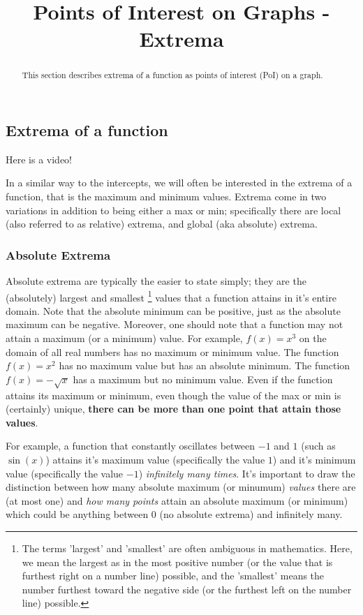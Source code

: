 \documentclass{ximera}
\title{Points of Interest on Graphs - Extrema}
\begin{document}
\begin{abstract}
    This section describes extrema of a function as points of interest (PoI) on a graph.
\end{abstract}
\maketitle



\subsection*{Extrema of a function}
    
    Here is a video!
    

    In a similar way to the intercepts, we will often be interested in the extrema of a function, that is the maximum and minimum values. Extrema come in two variations in addition to being either a max or min; specifically there are local (also referred to as relative) extrema, and global (aka absolute) extrema.
    
    \subsubsection*{Absolute Extrema}
        Absolute extrema are typically the easier to state simply; they are the (absolutely) largest and smallest%
        \footnote{%
            The terms 'largest' and 'smallest' are often ambiguous in mathematics. Here, we mean the largest as in the most positive number (or the value that is furthest right on a number line) possible, and the 'smallest' means the number furthest toward the negative side (or the furthest left on the number line) possible.%
            }
        values that a function attains in it's entire domain. Note that the absolute minimum can be positive, just as the absolute maximum can be negative. Moreover, one should note that a function may not attain a maximum (or a minimum) value. For example, $f(x) = x^3$ on the domain of all real numbers has no maximum or minimum value. The function $f(x) = x^2$ has no maximum value but has an absolute minimum. The function $f(x) = -\sqrt{x}$ has a maximum but no minimum value. Even if the function attains its maximum or minimum, even though the value of the max or min is (certainly) unique, \textbf{there can be more than one point that attain those values}. 
        
        For example, a function that constantly oscillates between $-1$ and $1$ (such as $\sin(x)$) attains it's maximum value (specifically the value $1$) and it's minimum value (specifically the value $-1$) \textit{infinitely many times}. It's important to draw the distinction between how many absolute maximum (or minumum) \textit{values} there are (at most one) and \textit{how many points} attain an absolute maximum (or minimum) which could be anything between 0 (no absolute extrema) and infinitely many.
        
\end{document}
